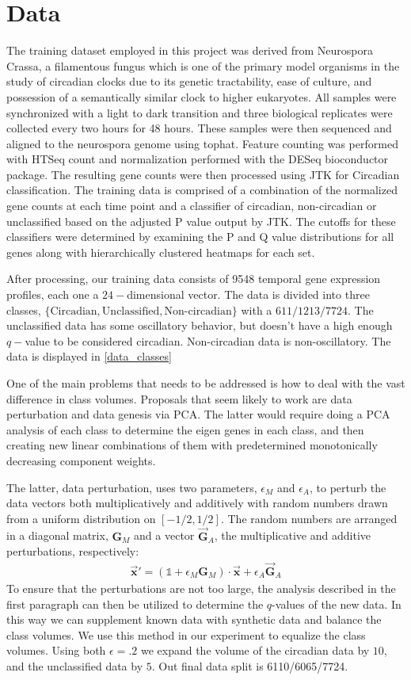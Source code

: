 \documentclass[prl,amsmath,amssymb,floatfix,superscriptaddress,notitlepage,twocolumn]{revtex4}
\newcommand{\ee}[1]{\begin{align} #1 \end{align}} 						%
\newcommand{\vc}[1]{\vec{\mathbf{#1}}} 								%
\begin{document}
\section{Data}

The training dataset employed in this project was derived from Neurospora Crassa, a filamentous fungus which is one of the primary model organisms in the study of circadian clocks due to its genetic tractability, ease of culture, and possession of a semantically similar clock to higher eukaryotes.  All samples were synchronized with a light to dark transition and three biological replicates were collected every two hours for 48 hours.  These samples were then sequenced and aligned to the neurospora genome using tophat.  Feature counting was performed with HTSeq count and normalization performed with the DESeq bioconductor package.  The resulting gene counts were then processed using JTK for Circadian classification.  The training data is comprised of a combination of the normalized gene counts at each time point and a classifier of circadian, non-circadian or unclassified based on the adjusted P value output by JTK. The cutoffs for these classifiers were determined by examining the P and Q value distributions for all genes along with hierarchically clustered heatmaps for each set.

After processing, our training data consists of 9548 temporal gene expression profiles, each one a $24-$dimensional vector. The data is divided into three classes, $\{\text{Circadian},\text{Unclassified},\text{Non-circadian}\}$ with a $611/1213/7724$. The unclassified data has some oscillatory behavior, but doesn't have a high enough $q-$value to be considered circadian. Non-circadian data is non-oscillatory. The data is displayed in \ref{data_classes}

One of the main problems that needs to be addressed is how to deal with the vast difference in class volumes. Proposals that seem likely to work are data perturbation and data genesis via PCA. The latter would require doing a PCA analysis of each class to determine the eigen genes in each class, and then creating new linear combinations of them with predetermined monotonically decreasing component weights. 

The latter, data perturbation, uses two parameters, $\epsilon_M$ and $\epsilon_A$, to perturb the data vectors both multiplicatively and additively with random numbers drawn from a uniform distribution on $[-1/2,1/2]$. The random numbers are arranged in a diagonal matrix, $\textbf{G}_M$ and a vector $\vc{G}_A$, the multiplicative and additive perturbations, respectively:
\ee{
\vc{x}' =(\mathbb{1}+\epsilon_M\textbf{G}_M )\cdot\vc{x}+\epsilon_A\vc{G}_A
} 
To ensure that the perturbations are not too large, the analysis described in the first paragraph can then be utilized to determine the $q$-values of the new data. In this way we can supplement known data with synthetic data and balance the class volumes. We use this method in our experiment to equalize the class volumes. Using both $\epsilon=.2$ we expand the volume of the circadian data by $10$, and the unclassified data by $5$. Out final data split is 6110/6065/7724. 
\end{document}
